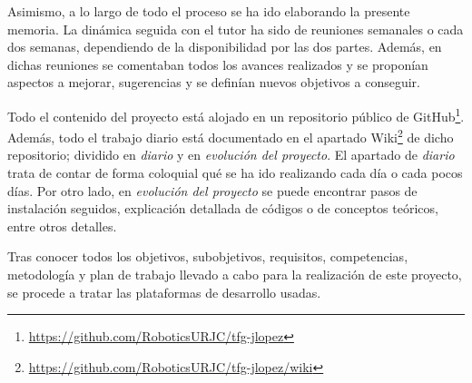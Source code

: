 Asimismo, a lo largo de todo el proceso se ha ido elaborando la presente memoria. La dinámica seguida con el tutor ha sido de reuniones semanales o cada dos semanas, dependiendo de la disponibilidad por las dos partes. Además, en dichas reuniones se comentaban todos los avances realizados y se proponían aspectos a mejorar, sugerencias y se definían nuevos objetivos a conseguir. 

Todo el contenido del proyecto está alojado en un repositorio público de GitHub\footnote{\url{https://github.com/RoboticsURJC/tfg-jlopez}}. Además, todo el trabajo diario está documentado en el apartado Wiki\footnote{\url{https://github.com/RoboticsURJC/tfg-jlopez/wiki}} de dicho repositorio; dividido en \textit{diario} y en \textit{evolución del proyecto}. El apartado de \textit{diario} trata de contar de forma coloquial qué se ha ido realizando cada día o cada pocos días. Por otro lado, en \textit{evolución del proyecto} se puede encontrar pasos de instalación seguidos, explicación detallada de códigos o de conceptos teóricos, entre otros detalles.

Tras conocer todos los objetivos, subobjetivos, requisitos, competencias, metodología y plan de trabajo llevado a cabo para la realización de este proyecto, se procede a tratar las plataformas de desarrollo usadas. 




